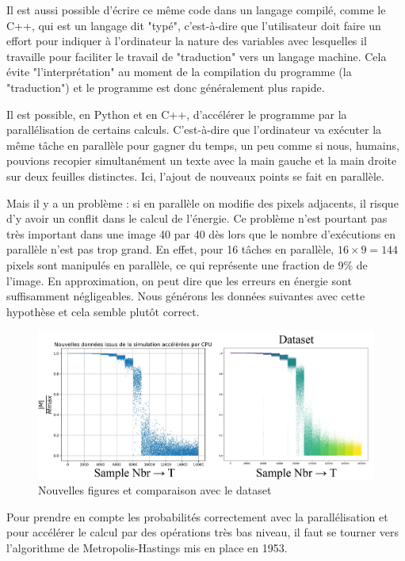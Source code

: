 \documentclass[11pt, parskip=half]{scrartcl} %
\begin{document}
Il est aussi possible d'écrire ce même code dans un langage compilé, comme le C++, qui est un langage dit "typé", c'est-à-dire que l'utilisateur doit faire un effort pour indiquer à l'ordinateur la nature des variables avec lesquelles il travaille pour faciliter le travail de "traduction" vers un langage machine. Cela évite "l'interprétation" au moment de la compilation du programme (la "traduction") et le programme est donc généralement plus rapide.

Il est possible, en Python et en C++, d'accélérer le programme par la parallélisation de certains calculs. C'est-à-dire que l'ordinateur va exécuter la même tâche en parallèle pour gagner du temps, un peu comme si nous, humains, pouvions recopier simultanément un texte avec la main gauche et la main droite sur deux feuilles distinctes. Ici, l'ajout de nouveaux points se fait en parallèle. 

Mais il y a un problème : si en parallèle on modifie des pixels adjacents, il risque d'y avoir un conflit dans le calcul de l'énergie. Ce problème n'est pourtant pas très important dans une image 40 par 40 dès lors que le nombre d'exécutions en parallèle n'est pas trop grand. En effet, pour 16 tâches en parallèle, $16 \times 9 = 144$ pixels sont manipulés en parallèle, ce qui représente une fraction de 9\% de l'image. En approximation, on peut dire que les erreurs en énergie sont suffisamment négligeables. Nous générons les données suivantes avec cette hypothèse et cela semble plutôt correct.

\begin{figure}[h]
\centering
\includegraphics[width=0.8\linewidth]{./figures/new_data_compare.jpg}
\caption{Nouvelles figures et comparaison avec le dataset}
\label{fig:H}
\end{figure}

Pour prendre en compte les probabilités correctement avec la parallélisation et pour accélérer le calcul par des opérations très bas niveau, il faut se tourner vers l'algorithme de Metropolis-Hastings mis en place en 1953.
\end{document}
